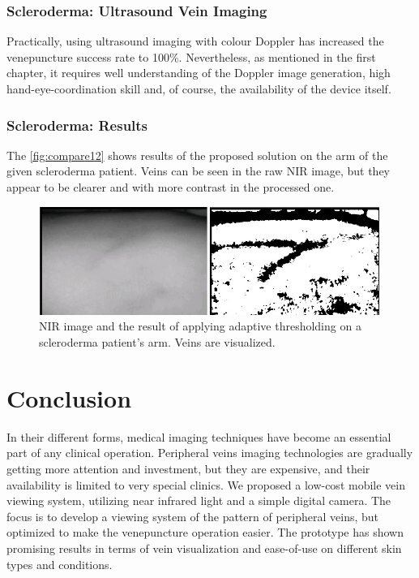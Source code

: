 \subsubsection{Scleroderma: Ultrasound Vein Imaging}
Practically, using ultrasound imaging with colour Doppler has increased the venepuncture success rate to 100\%.
Nevertheless, as mentioned in the first chapter, it requires well understanding of the Doppler image generation, high hand-eye-coordination skill and, of course, the availability of the device itself. 


\subsubsection{Scleroderma: Results}
The \autoref{fig:compare12} shows results of the proposed solution on the arm of the given scleroderma patient. Veins can be seen in the raw NIR image, but they appear to be clearer and with more contrast in the processed one.
\begin{figure}[H]
\centering
\includegraphics[scale=0.8]{figures/compare12.JPG}
\caption[NIR image and the result of applying adaptive thresholding on a scleroderma patient's arm]{NIR image and the result of applying adaptive thresholding on a scleroderma patient's arm. Veins are visualized.}\label{fig:compare12}
\end{figure}

\section{Conclusion}

In their different forms, medical imaging techniques have become an essential part of any clinical operation. Peripheral veins imaging technologies are gradually getting more attention and investment, but they are expensive, and their availability is limited to very special clinics. We proposed a low-cost mobile vein viewing system, utilizing near infrared light and a simple digital camera. The focus is to develop a viewing system of the pattern of peripheral veins, but optimized to make the venepuncture operation easier. The prototype has shown promising results in terms of vein visualization and ease-of-use on different skin types and conditions.

